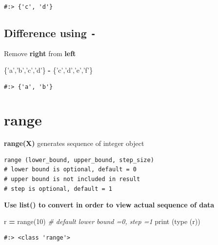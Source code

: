 \documentclass[
]{book}
\newenvironment{Shaded}{\begin{snugshade}}{\end{snugshade}}
\newcommand{\BuiltInTok}[1]{#1}
\newcommand{\CommentTok}[1]{\textcolor[rgb]{0.37,0.37,0.37}{\textit{#1}}}
\newcommand{\DecValTok}[1]{\textcolor[rgb]{0.06,0.06,0.06}{#1}}
\newcommand{\NormalTok}[1]{#1}
\newcommand{\OperatorTok}[1]{\textcolor[rgb]{0.43,0.43,0.43}{\textbf{#1}}}
\newcommand{\StringTok}[1]{\textcolor[rgb]{0.5,0.5,0.5}{#1}}
\begin{document}
\begin{verbatim}
#:> {'c', 'd'}
\end{verbatim}

\hypertarget{difference-using--}{%
\subsection{\texorpdfstring{Difference using \texttt{-}}{Difference using -}}\label{difference-using--}}

Remove \textbf{right} from \textbf{left}

\begin{Shaded}
\begin{Highlighting}[]
\NormalTok{\{}\StringTok{'a'}\NormalTok{,}\StringTok{'b'}\NormalTok{,}\StringTok{'c'}\NormalTok{,}\StringTok{'d'}\NormalTok{\} }\OperatorTok{-}\NormalTok{ \{}\StringTok{'c'}\NormalTok{,}\StringTok{'d'}\NormalTok{,}\StringTok{'e'}\NormalTok{,}\StringTok{'f'}\NormalTok{\}}
\end{Highlighting}
\end{Shaded}

\begin{verbatim}
#:> {'a', 'b'}
\end{verbatim}

\hypertarget{range}{%
\section{range}\label{range}}

\textbf{range(X)} generates sequence of integer object

\begin{verbatim}
range (lower_bound, upper_bound, step_size)  
# lower bound is optional, default = 0
# upper bound is not included in result
# step is optional, default = 1
\end{verbatim}

\textbf{Use list() to convert in order to view actual sequence of data}

\begin{Shaded}
\begin{Highlighting}[]
\NormalTok{r }\OperatorTok{=} \BuiltInTok{range}\NormalTok{(}\DecValTok{10}\NormalTok{)     }\CommentTok{# default lower bound =0, step =1}
\BuiltInTok{print}\NormalTok{ (}\BuiltInTok{type}\NormalTok{ (r))}
\end{Highlighting}
\end{Shaded}

\begin{verbatim}
#:> <class 'range'>
\end{verbatim}
\end{document}
